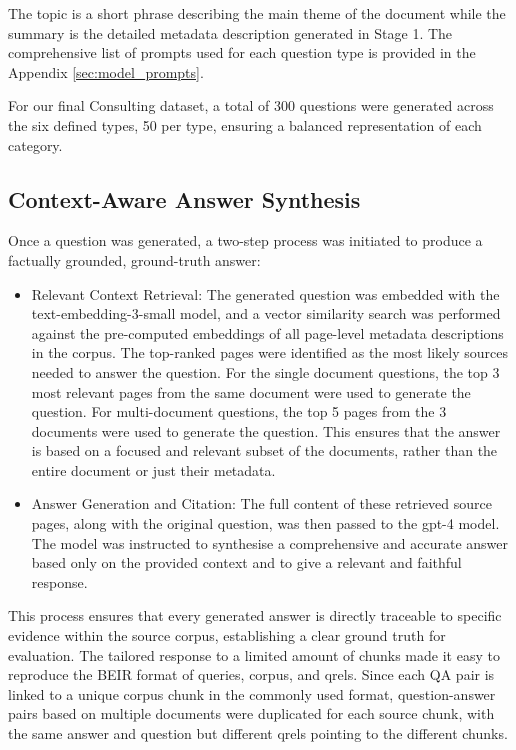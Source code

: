 \documentclass[12pt,twoside]{report}
\begin{document}
The topic is a short phrase describing the main theme of the document while the summary is the detailed metadata description generated in Stage 1. The comprehensive list of prompts used for each question type is provided in the Appendix \ref{sec:model_prompts}.

For our final Consulting dataset, a total of 300 questions were generated across the six defined types, 50 per type, ensuring a balanced representation of each category.

\subsection{Context-Aware Answer Synthesis}

Once a question was generated, a two-step process was initiated to produce a factually grounded, ground-truth answer:

\begin{itemize}
\item{Relevant Context Retrieval}: The generated question was embedded with the text-embedding-3-small model, and a vector similarity search was performed against the pre-computed embeddings of all page-level metadata descriptions in the corpus. The top-ranked pages were identified as the most likely sources needed to answer the question.
For the single document questions, the top 3 most relevant pages from the same document were used to generate the question. For multi-document questions, the top 5 pages from the 3 documents were used to generate the question. This ensures that the answer is based on a focused and relevant subset of the documents, rather than the entire document or just their metadata.

\item{Answer Generation and Citation}: The full content of these retrieved source pages, along with the original question, was then passed to the gpt-4 model. The model was instructed to synthesise a comprehensive and accurate answer based only on the provided context and to give a relevant and faithful response.
\end{itemize}

This process ensures that every generated answer is directly traceable to specific evidence within the source corpus, establishing a clear ground truth for evaluation. The tailored response to a limited amount of chunks made it easy to reproduce the BEIR format of queries, corpus, and qrels. Since each QA pair is linked to a unique corpus chunk in the commonly used format, question-answer pairs based on multiple documents were duplicated for each source chunk, with the same answer and question but different qrels pointing to the different chunks.
\end{document}
